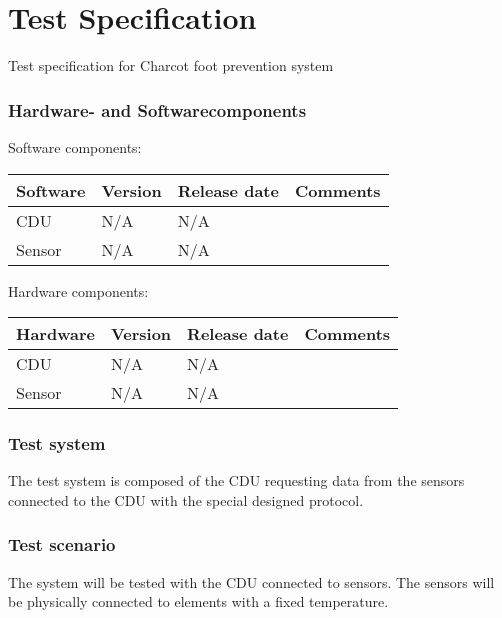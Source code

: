 \chapter{Test Specification}
Test specification for Charcot foot prevention system

\subsection{Hardware- and Softwarecomponents}

Software components:
\begin{table}[H]
    \begin{tabular}{|l|l|l|l|}
    \hline
    Software & Version & Release date & Comments \\ \hline
    CDU & N/A & N/A & ~ \\ \hline
    Sensor & N/A & N/A & ~ \\ \hline
    \end{tabular}
\end{table}

Hardware components:
\begin{table}[H]
    \begin{tabular}{|l|l|l|l|}
    \hline
    Hardware & Version & Release date & Comments \\ \hline
    CDU & N/A & N/A & ~ \\ \hline
    Sensor & N/A & N/A & ~ \\ \hline
    \end{tabular}
\end{table}

\subsection{Test system}
The test system is composed of the CDU requesting data from the sensors connected to the CDU with the special designed protocol.

\subsection{Test scenario}
The system will be tested with the CDU connected to sensors. The sensors will be physically connected to elements with a fixed temperature. 